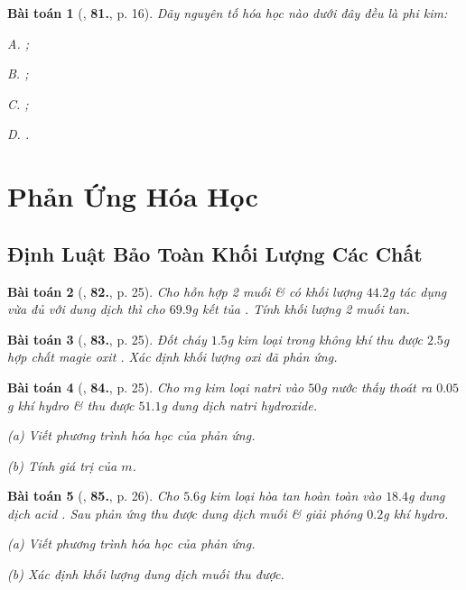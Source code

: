 \documentclass{article}
\numberwithin{equation}{section}
\newtheorem{baitoan}{Bài toán}[section]
\begin{document}
\begin{baitoan}[\cite{An2011}, \textbf{81.}, p. 16]
	Dãy nguyên tố hóa học nào dưới đây đều là phi kim:
	\begin{enumerate*}
		\item[{\rm\sf A.}] ;
		\item[{\rm\sf B.}] ;
		\item[{\rm\sf C.}] ;
		\item[{\rm\sf D.}] .
	\end{enumerate*}
\end{baitoan}


\section{Phản Ứng Hóa Học}

\subsection{Định Luật Bảo Toàn Khối Lượng Các Chất}

\begin{baitoan}[\cite{An2011}, \textbf{82.}, p. 25]
	Cho hỗn hợp 2 muối  \&  có khối lượng $44.2$g tác dụng vừa đủ với dung dịch  thì cho $69.9$g kết tủa . Tính khối lượng 2 muối tan.
\end{baitoan}

\begin{baitoan}[\cite{An2011}, \textbf{83.}, p. 25]
	Đốt cháy $1.5$g kim loại  trong không khí thu được $2.5$g hợp chất magie oxit . Xác định khối lượng oxi đã phản ứng.
\end{baitoan}

\begin{baitoan}[\cite{An2011}, \textbf{84.}, p. 25]
	Cho $m$g kim loại natri vào $50$g nước thấy thoát ra $0.05$g khí hydro \& thu được $51.1$g dung dịch natri hydroxide.
	\begin{enumerate*}
		\item[(a)] Viết phương trình hóa học của phản ứng.
		\item[(b)] Tính giá trị của $m$.
	\end{enumerate*}
\end{baitoan}

\begin{baitoan}[\cite{An2011}, \textbf{85.}, p. 26]
	Cho $5.6$g kim loại  hòa tan hoàn  toàn vào $18.4$g dung dịch acid . Sau phản ứng thu được dung dịch muối  \& giải phóng $0.2$g khí hydro.
	\begin{enumerate*}
		\item[(a)] Viết phương trình hóa học của phản ứng.
		\item[(b)] Xác định khối lượng dung dịch muối  thu được.
	\end{enumerate*}
\end{baitoan}
\end{document}
